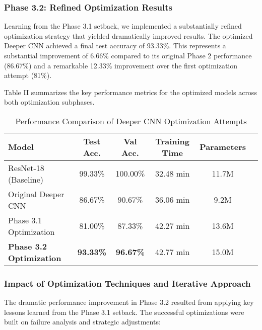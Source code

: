 \subsubsection{Phase 3.2: Refined Optimization Results}
Learning from the Phase 3.1 setback, we implemented a substantially refined optimization strategy that yielded dramatically improved results. The optimized Deeper CNN achieved a final test accuracy of 93.33\%. This represents a substantial improvement of 6.66\% compared to its original Phase 2 performance (86.67\%) and a remarkable 12.33\% improvement over the first optimization attempt (81\%).

Table II summarizes the key performance metrics for the optimized models across both optimization subphases.

\begin{table}[ht]
\caption{Performance Comparison of Deeper CNN Optimization Attempts}
\centering
\begin{tabular}{lccccc}
\toprule
\textbf{Model} & \textbf{Test Acc.} & \textbf{Val Acc.} & \textbf{Training Time} & \textbf{Parameters} \\
\midrule
ResNet-18 (Baseline) & 99.33\% & 100.00\% & 32.48 min & 11.7M \\
Original Deeper CNN & 86.67\% & 90.67\% & 36.06 min & 9.2M \\
Phase 3.1 Optimization & 81.00\% & 87.33\% & 42.27 min & 13.6M \\
\textbf{Phase 3.2 Optimization} & \textbf{93.33\%} & \textbf{96.67\%} & 42.77 min & 15.0M \\
\bottomrule
\end{tabular}
\end{table}

\subsubsection{Impact of Optimization Techniques and Iterative Approach}
The dramatic performance improvement in Phase 3.2 resulted from applying key lessons learned from the Phase 3.1 setback. The successful optimizations were built on failure analysis and strategic adjustments:

